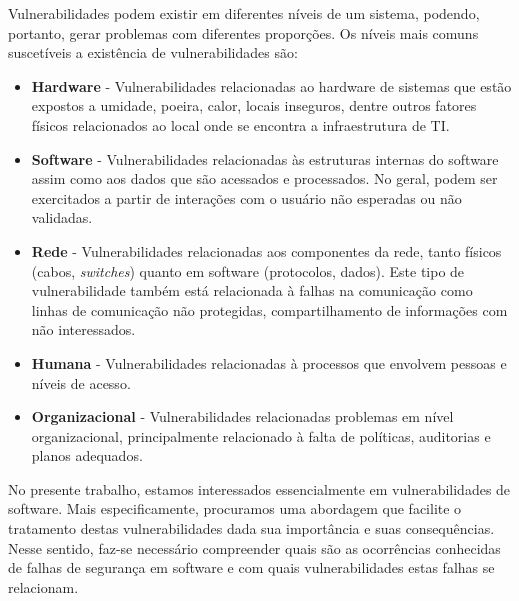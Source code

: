 %

Vulnerabilidades podem existir em diferentes níveis de um sistema, podendo, portanto, gerar problemas com diferentes proporções. Os níveis mais comuns suscetíveis a existência de vulnerabilidades são:

%

\begin{itemize}
\item \textbf{Hardware} - Vulnerabilidades relacionadas ao hardware de sistemas que estão expostos a umidade, poeira, calor, locais inseguros, dentre outros fatores físicos relacionados ao local onde se encontra a infraestrutura de TI.

\item \textbf{Software} - Vulnerabilidades relacionadas às estruturas internas do software assim como aos dados que são acessados e processados. No geral, podem ser exercitados a partir de interações com o usuário não esperadas ou não validadas.

\item \textbf{Rede} - Vulnerabilidades relacionadas aos componentes da rede, tanto físicos (cabos, \emph{switches}) quanto em software (protocolos, dados). Este tipo de vulnerabilidade também está relacionada à falhas na comunicação como linhas de comunicação não protegidas, compartilhamento de informações com não interessados.

\item \textbf{Humana} - Vulnerabilidades relacionadas à processos que envolvem pessoas e níveis de acesso.

\item \textbf{Organizacional} - Vulnerabilidades relacionadas problemas em nível organizacional, principalmente relacionado à falta de políticas, auditorias e planos adequados.
\end{itemize}

%

No presente trabalho, estamos interessados essencialmente em vulnerabilidades de software. Mais especificamente, procuramos uma abordagem que facilite o tratamento destas vulnerabilidades dada sua importância e suas consequências. Nesse sentido, faz-se necessário compreender quais são as ocorrências conhecidas de falhas de segurança em software e com quais vulnerabilidades estas falhas se relacionam.

%

